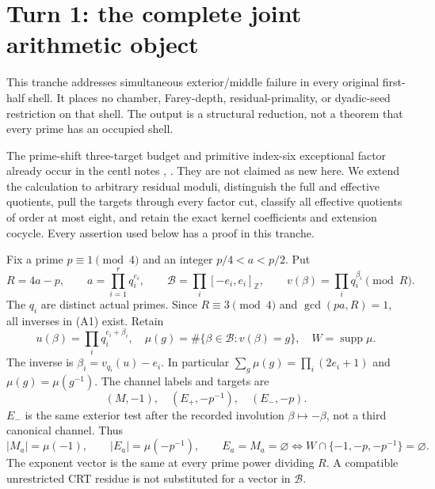 \section{Turn 1: the complete joint arithmetic object}
This tranche addresses simultaneous exterior/middle failure in every original
first-half shell. It places no chamber, Farey-depth, residual-primality, or
dyadic-seed restriction on that shell. The output is a structural reduction,
not a theorem that every prime has an occupied shell.

The prime-shift three-target budget and primitive index-six exceptional factor
already occur in the centl notes \cite[\S\S4--9]{BryanTwo},
\cite[\S\S3--8]{BryanSix}. They are not claimed as new here. We extend the
calculation to arbitrary residual moduli, distinguish the full and effective
quotients, pull the targets through every factor cut, classify all effective
quotients of order at most eight, and retain the exact kernel coefficients
and extension cocycle. Every assertion used below has a proof in this tranche.

Fix a prime $p\equiv1\pmod4$ and an integer $p/4<a<p/2$. Put
\[
 R=4a-p,\qquad a=\prod_{i=1}^r q_i^{e_i},\qquad
 \mathcal B=\prod_i[-e_i,e_i]_{\mathbb Z},\qquad
 v(\beta)=\prod_iq_i^{\beta_i}\pmod R.                 \tag{A1}
\]
The $q_i$ are distinct actual primes. Since $R\equiv3\pmod4$ and
$\gcd(pa,R)=1$, all inverses in (A1) exist. Retain
\[
 u(\beta)=\prod_iq_i^{e_i+\beta_i},\quad
 \mu(g)=\#\{\beta\in\mathcal B:v(\beta)=g\},\quad W=\operatorname{supp}\mu.
                                                               \tag{A2}
\]
The inverse is $\beta_i=v_{q_i}(u)-e_i$. In particular
$\sum_g\mu(g)=\prod_i(2e_i+1)$ and $\mu(g)=\mu(g^{-1})$.
The channel labels and targets are
\[
 (M,-1),\quad(E_+,-p^{-1}),\quad(E_-,-p).                 \tag{A3}
\]
$E_-$ is the same exterior test after the recorded involution
$\beta\mapsto-\beta$, not a third canonical channel. Thus
\[
 |M_a|=\mu(-1),\qquad |E_a|=\mu(-p^{-1}),\qquad
 E_a=M_a=\varnothing\iff W\cap\{-1,-p,-p^{-1}\}=\varnothing. \tag{A4}
\]
The exponent vector is the same at every prime power dividing $R$.
A compatible unrestricted CRT residue is not substituted for a vector in
$\mathcal B$.

